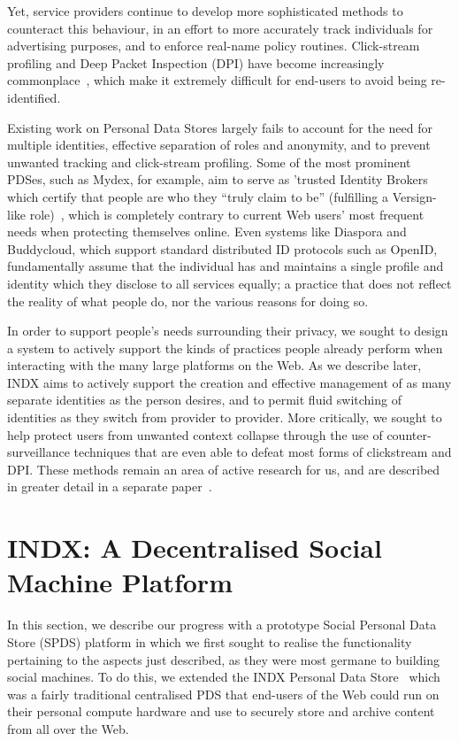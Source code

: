\documentclass{sig-alternate}
\begin{document}
Yet, service providers continue to develop more sophisticated methods to counteract this behaviour, in an effort to more accurately track individuals for advertising purposes, and to enforce real-name policy routines.  Click-stream profiling and Deep Packet Inspection (DPI) have become increasingly commonplace~\cite{bendrath2011end,collins2009privacy}, which make it extremely difficult for end-users to avoid being re-identified. 

Existing work on Personal Data Stores largely fails to account for the need for multiple identities, effective separation of roles and anonymity, and to prevent unwanted tracking and click-stream profiling.  Some of the most prominent PDSes, such as Mydex, for example, aim to serve as 'trusted Identity Brokers which certify that people are who they ``truly claim to be'' (fulfilling a Versign-like role)~\cite{heath2013digital}, which is completely contrary to current Web users'  most frequent needs when protecting themselves online.  Even systems like Diaspora and Buddycloud, which support standard distributed ID protocols such as OpenID, fundamentally assume that the individual has and maintains a single profile and identity which they disclose to all services equally; a practice that does not reflect the reality of what people do, nor the various reasons for doing so.

In order to support people's needs surrounding their privacy, we sought to design a system to actively support the kinds of practices people already perform when interacting with the many large platforms on the Web.  As we describe later, INDX aims to actively support the creation and effective management of as many separate identities as the person desires, and to permit fluid switching of identities as they switch from provider to provider.  More critically, we sought to help protect users from unwanted context collapse through the use of counter-surveillance techniques that are even able to defeat most forms of clickstream and DPI.  These methods remain an area of active research for us, and are described in greater detail in a separate paper~\cite{murray2014social}.


\section{INDX: A Decentralised Social Machine Platform}

In this section, we describe our progress with a prototype Social Personal Data Store (SPDS) platform
in which we first sought to realise the functionality pertaining to the aspects just described, as they
were most germane to building social machines.  To do this, we extended the INDX Personal Data Store~\cite{van2012decentralized}
which was a fairly traditional centralised PDS that end-users of the Web could run on their personal compute
hardware and use to securely store and archive content from all over the Web.  
\end{document}
